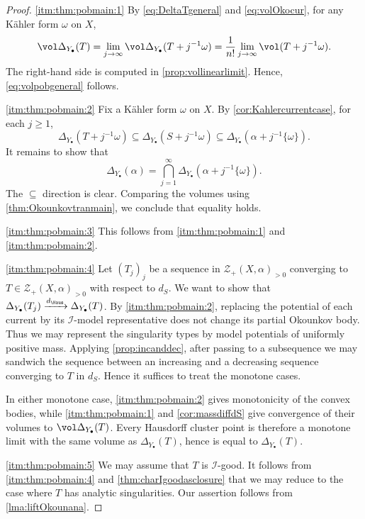 \begin{proof}
\ref{itm:thm:pobmain:1} By \eqref{eq:DeltaTgeneral} and \eqref{eq:volOkocur}, for any Kähler form $\omega$ on $X$,
\[
\vol \Delta_{Y_{\bullet}}(T)=\lim_{j\to\infty}\vol \Delta_{Y_{\bullet}}(T+j^{-1}\omega)=\frac{1}{n!}\lim_{j\to\infty}\vol(T+j^{-1}\omega).
\]
The right-hand side is computed in \cref{prop:vollinearlimit}. Hence, \eqref{eq:volpobgeneral} follows.

\ref{itm:thm:pobmain:2} Fix a Kähler form $\omega$ on $X$. By \cref{cor:Kahlercurrentcase}, for each $j\geq 1$,
\[
\Delta_{Y_{\bullet}}(T+j^{-1}\omega)\subseteq \Delta_{Y_{\bullet}}(S+j^{-1}\omega)\subseteq \Delta_{Y_{\bullet}}(\alpha+j^{-1}\{\omega\}).
\]
It remains to show that
\[
\Delta_{Y_{\bullet}}(\alpha)=\bigcap_{j=1}^{\infty}\Delta_{Y_{\bullet}}(\alpha+j^{-1}\{\omega\}).
\]
The $\subseteq$ direction is clear. Comparing the volumes using \cref{thm:Okounkovtranmain}, we conclude that equality holds.

\ref{itm:thm:pobmain:3} This follows from \ref{itm:thm:pobmain:1} and \ref{itm:thm:pobmain:2}.

\ref{itm:thm:pobmain:4} Let $(T_j)_j$ be a sequence in $\mathcal{Z}_+(X,\alpha)_{>0}$ converging to $T\in \mathcal{Z}_+(X,\alpha)_{>0}$ with respect to $d_S$. We want to show that $\Delta_{Y_{\bullet}}(T_j)\xrightarrow{d_{\Haus}} \Delta_{Y_{\bullet}}(T)$. By \ref{itm:thm:pobmain:2}, replacing the potential of each current by its $\mathcal I$-model representative does not change its partial Okounkov body. Thus we may represent the singularity types by model potentials of uniformly positive mass. Applying \cref{prop:incanddec}, after passing to a subsequence we may sandwich the sequence between an increasing and a decreasing sequence converging to $T$ in $d_S$. Hence it suffices to treat the monotone cases.

In either monotone case, \ref{itm:thm:pobmain:2} gives monotonicity of the convex bodies, while \ref{itm:thm:pobmain:1} and \cref{cor:massdiffdS} give convergence of their volumes to $\vol\Delta_{Y_{\bullet}}(T)$. Every Hausdorff cluster point is therefore a monotone limit with the same volume as $\Delta_{Y_{\bullet}}(T)$, hence is equal to $\Delta_{Y_{\bullet}}(T)$.

\ref{itm:thm:pobmain:5} We may assume that $T$ is $\mathcal{I}$-good. It follows from \ref{itm:thm:pobmain:4} and \cref{thm:charIgoodasclosure} that we may reduce to the case where $T$ has analytic singularities. Our assertion follows from \cref{lma:liftOkounana}.


\end{proof}
